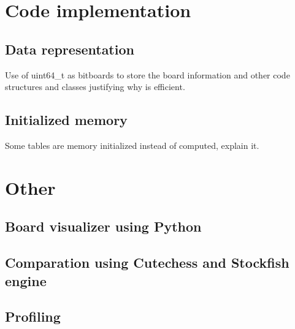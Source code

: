 \section{Code implementation}

\subsection{Data representation}

Use of uint64\_t as bitboards to store the board information and other code structures and classes justifying why is efficient.

\subsection{Initialized memory}

Some tables are memory initialized instead of computed, explain it.

\section{Other}

\subsection{Board visualizer using Python}

\subsection{Comparation using Cutechess and Stockfish engine}

\subsection{Profiling}